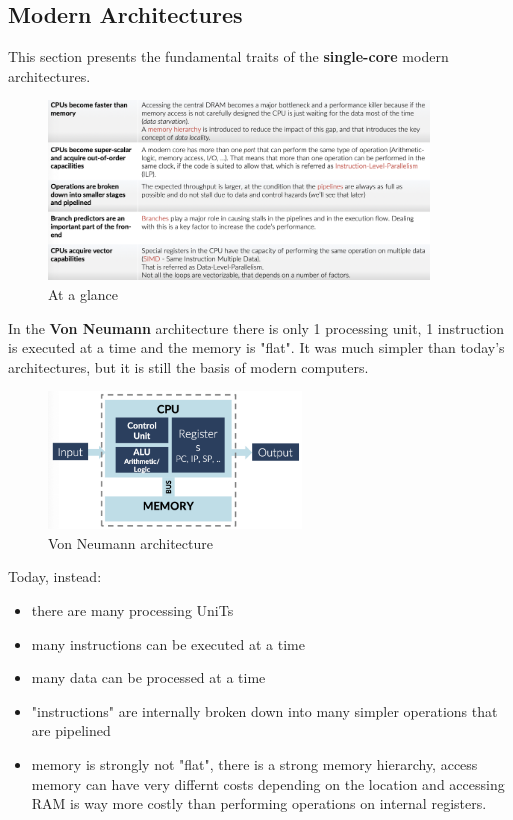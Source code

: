 \newpage
\subsection{Modern Architectures}

This section presents the fundamental traits of the \textbf{single-core} modern architectures.

\begin{figure}[H]
    \centering
    \includegraphics[width=0.9\textwidth]{assets/opt2.png}
    \caption{At a glance}
\end{figure}

In the \textbf{Von Neumann} architecture there is only 1 processing unit, 1 instruction is executed at a time and the memory is "flat".  It was much simpler than today's architectures, but it is still the basis of modern computers.

\begin{figure}[H]
    \centering
    \includegraphics[width=0.6\textwidth]{assets/opt3.png}
    \caption{Von Neumann architecture}
\end{figure}
        
Today, instead:
\begin{itemize}
    \item there are many processing UniTs
    \item many instructions can be executed at a time 
    \item many data can be processed at a time 
    \item "instructions" are internally broken down into many simpler operations that are pipelined 
    \item memory is strongly not "flat", there is a strong memory hierarchy, access memory can have very differnt costs depending on the location and accessing RAM is way more costly than performing operations on internal registers.
\end{itemize}

